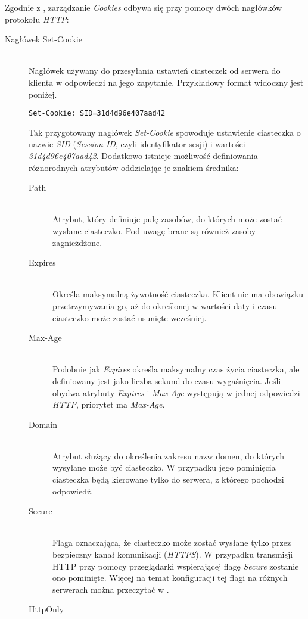 \documentclass[11pt]{aghdpl}
\begin{document}
Zgodnie z \cite{RfcC11}, zarządzanie \emph{Cookies} odbywa się przy pomocy dwóch nagłówków protokołu \emph{HTTP}:
\begin{description}
\item[Nagłówek Set-Cookie] \hfill \\
Nagłówek używany do przesyłania ustawień ciasteczek od serwera do klienta w odpowiedzi na jego zapytanie. Przykładowy format widoczny jest poniżej.
\begin{lstlisting}
Set-Cookie: SID=31d4d96e407aad42
\end{lstlisting}
Tak przygotowany nagłówek \emph{Set-Cookie} spowoduje ustawienie ciasteczka o nazwie \emph{SID} (\emph{Session ID}, czyli identyfikator sesji) i wartości \emph{31d4d96e407aad42}. Dodatkowo istnieje możliwość definiowania różnorodnych atrybutów oddzielając je znakiem średnika:
\begin{description}
\item[Path] \hfill \\
Atrybut, który definiuje pulę zasobów, do których może zostać wysłane ciasteczko. Pod uwagę brane są również zasoby zagnieżdżone.
\item[Expires] \hfill \\
Określa maksymalną żywotność ciasteczka. Klient nie ma obowiązku przetrzymywania go, aż do określonej w wartości daty i czasu - ciasteczko może zostać usunięte wcześniej.
\item[Max-Age] \hfill \\
Podobnie jak \emph{Expires} określa maksymalny czas życia ciasteczka, ale definiowany jest jako liczba sekund do czasu wygaśnięcia. Jeśli obydwa atrybuty \emph{Expires} i \emph{Max-Age} występują w jednej odpowiedzi \emph{HTTP}, priorytet ma \emph{Max-Age}.
\item[Domain] \hfill \\
Atrybut służący do określenia zakresu nazw domen, do których wysyłane może być ciasteczko. W przypadku jego pominięcia ciasteczka będą kierowane tylko do serwera, z którego pochodzi odpowiedź.
\item[Secure] \hfill \\
Flaga oznaczająca, że ciasteczko może zostać wysłane tylko przez bezpieczny kanał komunikacji (\emph{HTTPS}). W przypadku transmisji HTTP przy pomocy przeglądarki wspierającej flagę \emph{Secure} zostanie ono pominięte. Więcej na temat konfiguracji tej flagi na różnych serwerach można przeczytać w \cite{SecF}.
\item[HttpOnly] \hfill \\

\end{description}
\end{description}
\end{document}
